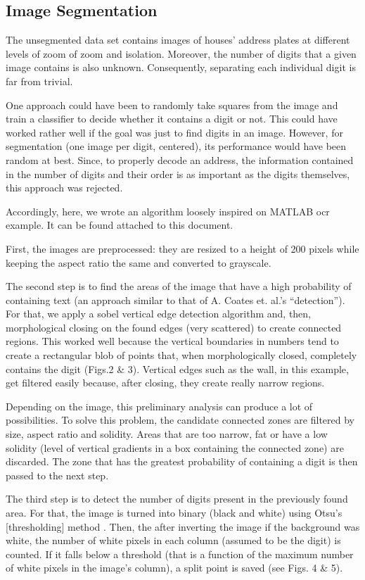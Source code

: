\documentclass{article} %
\begin{document}
\subsection{Image Segmentation}
The unsegmented data set contains images of houses’ address plates at different levels of zoom of zoom and isolation. Moreover, the number of digits that a given image contains is also unknown. Consequently, separating each individual digit is far from trivial.

One approach could have been to randomly take squares from the image and train a classifier to decide whether it contains a digit or not. This could have worked rather well if the goal was just to find digits in an image. However, for segmentation (one image per digit, centered), its performance would have been random at best. Since, to properly decode an address, the information contained in the number of digits and their order is as important as the digits themselves, this approach was rejected.

Accordingly, here, we wrote an algorithm loosely inspired on MATLAB ocr example. It can be found attached to this document.

First, the images are preprocessed: they are resized to a height of 200 pixels while keeping the aspect ratio the same and converted to grayscale.

The second step is to find the areas of the image that have a high probability of containing text (an approach similar to that of A. Coates et. al.’s “detection”). For that, we apply a sobel vertical edge detection algorithm and, then, morphological closing on the found edges (very scattered) to create connected regions. This worked well because the vertical boundaries in numbers tend to create a rectangular blob of points that, when morphologically closed, completely contains the digit (Figs.2 \& 3). Vertical edges such as the wall, in this example, get filtered easily because, after closing, they create really narrow regions. 

Depending on the image, this preliminary analysis can produce a lot of possibilities. To solve this problem, the candidate connected zones are filtered by size, aspect ratio and solidity. Areas that are too narrow, fat or have a low solidity (level of vertical gradients in a box containing the connected zone) are discarded. The zone that has the greatest probability of containing a digit is then passed to the next step.

The third step is to detect the number of digits present in the previously found area. For that, the image is turned into binary (black and white) using Otsu’s [thresholding] method . Then, the after inverting the image if the background was white, the number of white pixels in each column (assumed to be the digit) is counted. If it falls below a threshold (that is a function of the maximum number of white pixels in the image’s column), a split point is saved (see Figs. 4 \& 5).
\end{document}
